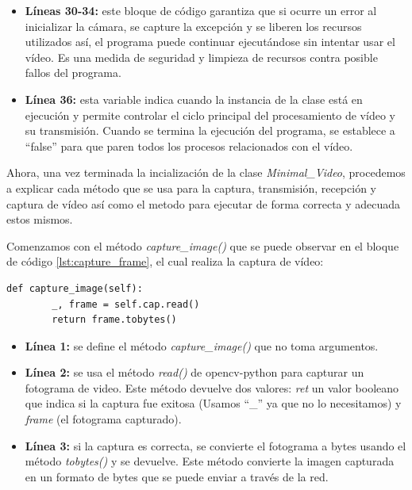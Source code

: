 \begin{itemize}
    \item \textbf{Líneas 30-34:} este bloque de código garantiza que si ocurre un error al inicializar la cámara, se capture la excepción y se liberen los recursos utilizados así, el programa puede continuar ejecutándose sin intentar usar el vídeo. Es una medida de seguridad y limpieza de recursos contra posible fallos del programa.
    \item \textbf{Línea 36:} esta variable indica cuando la instancia de la clase está en ejecución y permite controlar el ciclo principal del procesamiento de vídeo y su transmisión. Cuando se termina la ejecución del programa, se establece a ``false'' para que paren todos los procesos relacionados con el vídeo.
\end{itemize}

Ahora, una vez terminada la incialización de la clase \textit{Minimal\_Video}, procedemos a explicar cada método que se usa para la captura, transmisión, recepción y captura de vídeo así como el metodo para ejecutar de forma correcta y adecuada estos mismos.
\vspace{\baselineskip}

Comenzamos con el método \textit{capture\_image()} que se puede observar en el bloque de código \ref{lst:capture_frame}, el cual realiza la captura de vídeo:
\begin{lstlisting}[style=pythonstyle, caption={Método capture\_frame() de \textit{Minimal\_Video}}, label={lst:capture_frame}]
def capture_image(self):
        _, frame = self.cap.read()
        return frame.tobytes()
\end{lstlisting}

\begin{itemize}
    \item \textbf{Línea 1:} se define el método \textit{capture\_image()} que no toma argumentos.
    \item \textbf{Línea 2:} se usa el método \textit{read()} de opencv-python para capturar un fotograma de video. Este método devuelve dos valores: \textit{ret} un valor booleano que indica si la captura fue exitosa (Usamos ``\_'' ya que no lo necesitamos) y \textit{frame} (el fotograma capturado).
    \item \textbf{Línea 3:} si la captura es correcta, se convierte el fotograma a bytes usando el método \textit{tobytes()} y se devuelve. Este método convierte la imagen capturada en un formato de bytes que se puede enviar a través de la red.
\end{itemize}
\vspace{\baselineskip}

